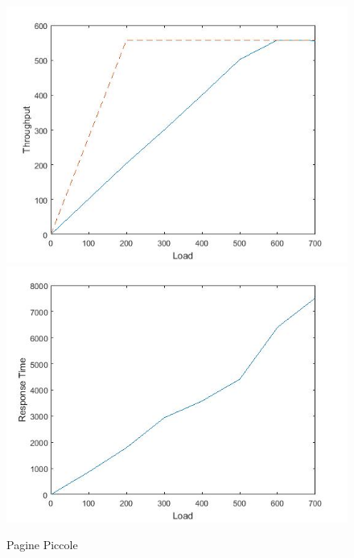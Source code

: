 		\begin{figure}[H]
			\centering
			\includegraphics[scale=0.6]{./immagine/piccolaT.jpg}
			\includegraphics[scale=0.6]{./immagine/piccolaR.jpg}
			\caption{Pagine Piccole}
			\label{fig:ct-p}
		\end{figure}

